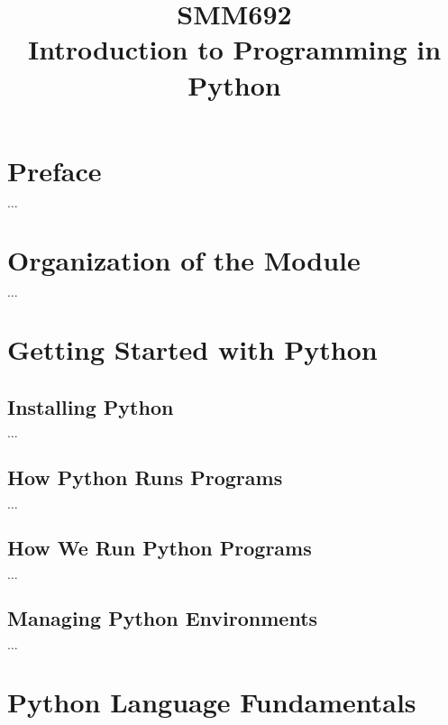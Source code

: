 \documentclass[a4paper,11pt]{book}
\title{%
        \begin{tcolorbox}[before skip = \baselineskip, after skip =-\baselineskip]
            \centering\Huge\sffamily SMM692\\ Introduction to Programming in Python 
        \end{tcolorbox}
}
\date{}
\numberwithin{figure}{chapter}
\numberwithin{table}{chapter}
\begin{document}
    
\maketitle  

\clearpage

\tableofcontents

\listoffigures

\listoftables

\clearpage

\chapter*{Preface}

$\ldots$

\chapter{Organization of the Module}

$\ldots$

\chapter{Getting Started with Python}

\section{Installing Python}

$\ldots$

\section{How Python Runs Programs}

$\ldots$

\section{How We Run Python Programs}

$\ldots$

\section{Managing Python Environments}

$\ldots$

\chapter{Python Language Fundamentals}
\end{document}
